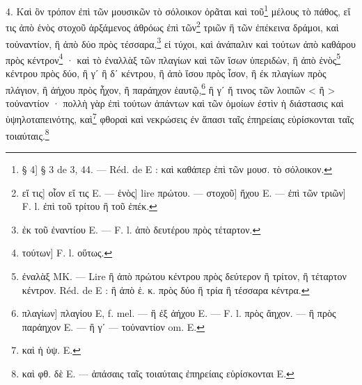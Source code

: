 \documentclass[a4paper, 11pt, oneside, polutonikogreek, french]{article}
\begin{document}
4. Καὶ ὃν τρόπον ἐπὶ τῶν μουσικῶν τὸ σόλοικον ὁρᾶται καὶ τοῦ\footnote{§ 4] § 3 de 3, 44. --- Réd. de E : καὶ καθάπερ ἐπὶ τῶν μουσ. τὸ σόλοικον.} μέλους τὸ πάθος, εἴ τις ἀπὸ ἑνὸς στοχοῦ ἀρξάμενος ἀθρόως ἐπὶ τῶν\footnote{εἴ τις] οἷον εἴ τις E. --- ἑνὸς] lire πρώτου. --- στοχοῦ] ἤχου E. --- ἐπὶ τῶν τριῶν] F. l. ἐπὶ τοῦ τρίτου ἢ τοῦ ἐπέκ.} τριῶν ἢ τῶν ἐπέκεινα δράμοι, καὶ τοὐναντίον, ἢ ἀπὸ δύο πρὸς τέσσαρα,\footnote{ἐκ τοῦ ἐναντίου E. --- F. l. ἀπὸ δευτέρου πρὸς τέταρτον.} εἰ τύχοι, καὶ ἀνάπαλιν καὶ τούτων ἀπὸ καθάρου πρὸς κέντρον\footnote{τούτων] F. l. οὕτως.} · καὶ τὸ ἐναλλὰξ τῶν πλαγίων καὶ τῶν ἴσων ὑπεριδὼν, ἢ ἀπὸ ἑνὸς\footnote{ἐναλὰξ MK. --- Lire ἢ ἀπὸ πρώτου κέντρου πρὸς δεύτερον ἢ τρίτον, ἢ τέταρτον κέντρον. Réd. de E : ἢ ἀπὸ ἑ. κ. πρὸς δύο ἢ τρία ἢ τέσσαρα κέντρα.} κέντρου πρὸς δύο, ἢ γʹ ἢ δʹ κέντρου, ἢ ἀπὸ ἴσου πρὸς ἶσον, ἢ ἐκ πλαγίων πρὸς πλάγιον, ἢ ἀήχου πρὸς ἦχον, ἢ παράηχον ἑαυτῷ,\footnote{πλαγίων] πλαγίου E, f. mel. --- ἢ ἐξ ἀήχου E. --- F. l. πρὸς ἄηχον. --- ἢ πρὸς παράηχον E. --- ἢ γʹ --- τοὐναντίον om. E.} ἢ γʹ ἤ τινος τῶν λοιπῶν < ἢ > τοὐναντίον · πολλὴ γὰρ ἐπὶ τούτων ἁπάντων καὶ τῶν ὁμοίων ἐστὶν ἡ διάστασις καὶ ὑψηλοταπεινότης, καὶ\footnote{καὶ ἡ ὑψ. E.} φθοραὶ καὶ νεκρώσεις ἐν ἅπασι ταῖς ἐπηρείαις εὑρίσκονται ταῖς τοιαύταις.\footnote{καὶ φθ. δὲ E. --- ἁπάσαις ταῖς τοιαύταις ἐπηρείαις εὑρίσκονται E.}
\end{document}
